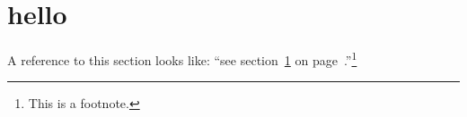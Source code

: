 \documentclass{report}
\begin{document}
\section{hello} \label{sec:this}
A reference to this section looks like: ``see section~\ref{sec:this} on page~\pageref{sec:this}.''\footnote{This is a footnote.}
\end{document}
